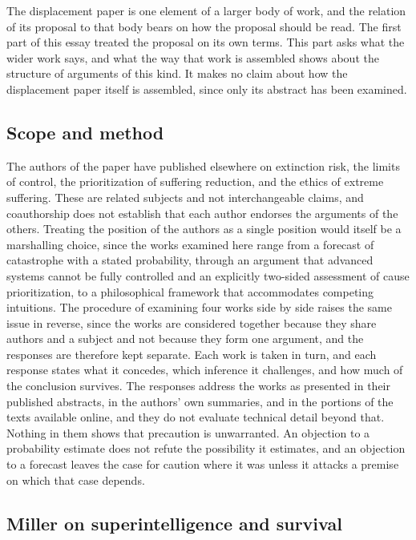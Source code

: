 \documentclass[11pt]{article}
\begin{document}
The displacement paper is one element of a larger body of work, and the relation of its proposal to that body bears on how the proposal should be read. The first part of this essay treated the proposal on its own terms. This part asks what the wider work says, and what the way that work is assembled shows about the structure of arguments of this kind. It makes no claim about how the displacement paper itself is assembled, since only its abstract has been examined.

\subsection{Scope and method}

The authors of the paper have published elsewhere on extinction risk, the limits of control, the prioritization of suffering reduction, and the ethics of extreme suffering. These are related subjects and not interchangeable claims, and coauthorship does not establish that each author endorses the arguments of the others. Treating the position of the authors as a single position would itself be a marshalling choice, since the works examined here range from a forecast of catastrophe with a stated probability, through an argument that advanced systems cannot be fully controlled and an explicitly two-sided assessment of cause prioritization, to a philosophical framework that accommodates competing intuitions. The procedure of examining four works side by side raises the same issue in reverse, since the works are considered together because they share authors and a subject and not because they form one argument, and the responses are therefore kept separate. Each work is taken in turn, and each response states what it concedes, which inference it challenges, and how much of the conclusion survives. The responses address the works as presented in their published abstracts, in the authors' own summaries, and in the portions of the texts available online, and they do not evaluate technical detail beyond that. Nothing in them shows that precaution is unwarranted. An objection to a probability estimate does not refute the possibility it estimates, and an objection to a forecast leaves the case for caution where it was unless it attacks a premise on which that case depends.

\subsection{Miller on superintelligence and survival}
\end{document}
